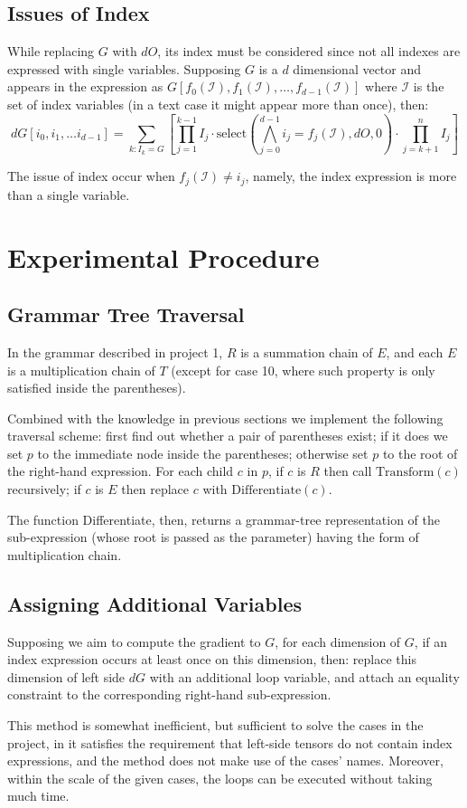 \documentclass[a4paper,11pt]{article}
\begin{document}
	\subsection{Issues of Index}
	While replacing $G$ with $dO$, its index must be considered since not all indexes are expressed with single variables. Supposing $G$ is a $d$ dimensional vector and appears in the expression as $G[f_0(\mathcal{I}), f_1(\mathcal{I}), \dots, f_{d-1}(\mathcal{I})]$ where $\mathcal{I}$ is the set of index variables (in a text case it might appear more than once), then:
	\begin{equation*}
		dG[i_0,i_1,\dots i_{d-1}] = \sum_{k:I_k=G}{\left[\prod_{j=1}^{k-1}{I_j}\cdot \text{select}\left(\bigwedge_{j=0}^{d-1}{i_j=f_j(\mathcal{I})},dO,0\right) \cdot \prod_{j=k+1}^{n}{I_j}\right]}
	\end{equation*}
	\par 
	The issue of index occur when $f_j(\mathcal{I}) \neq i_j$, namely, the index expression is more than a single variable. 
	\section{Experimental Procedure}
	\subsection{Grammar Tree Traversal}
	In the grammar described in project 1, $R$ is a summation chain of $E$, and each $E$ is a multiplication chain of $T$ (except for case 10, where such property is only satisfied inside the parentheses). \par 
	Combined with the knowledge in previous sections we implement the following traversal scheme: first find out whether a pair of parentheses exist; if it does we set $p$ to the immediate node inside the parentheses; otherwise set $p$ to the root of the right-hand expression. For each child $c$ in $p$, if $c$ is $R$ then call $\text{Transform}(c)$ recursively; if $c$ is $E$ then replace $c$ with $\text{Differentiate}(c)$. \par 
	The function Differentiate, then, returns a grammar-tree representation of the sub-expression (whose root is passed as the parameter) having the form of multiplication chain. 
	\subsection{Assigning Additional Variables}
	Supposing we aim to compute the gradient to $G$, for each dimension of $G$, if an index expression occurs at least once on this dimension, then: replace this dimension of left side $dG$ with an additional loop variable, and attach an equality constraint to the corresponding right-hand sub-expression. \par 
	This method is somewhat inefficient, but sufficient to solve the cases in the project, in it satisfies the requirement that left-side tensors do not contain index expressions, and the method does not make use of the cases' names. Moreover, within the scale of the given cases, the loops can be executed without taking much time. \par 
\end{document}
